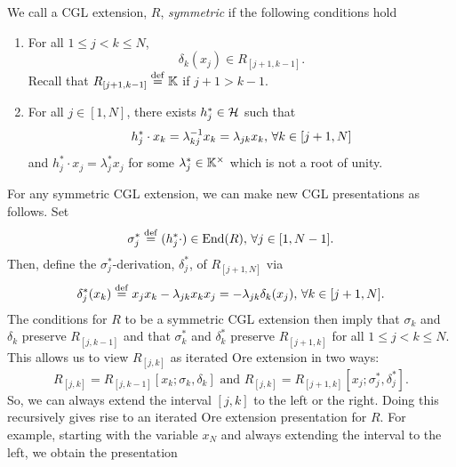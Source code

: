 \begin{definition}
	We call a CGL extension, $R$, \emph{symmetric} if the following conditions hold
	\begin{enumerate}
		\item For all $1\leq j < k \leq N$,
		      \begin{equation*}
			      \delta_k (x_j) \in R_{[j+1, k-1]}.
		      \end{equation*}
		      Recall that $R_{[j+1,k-1]} \overset{\mathrm{def}}{=} \mathbb{K}$ if $j +1 > k-1$.
		\item For all $j \in [1, N]$, there exists $h^*_j \in \mathcal{H}$ such that
		      \begin{equation*}
			      h^*_j \cdot x_k = \lambda_{kj}^{-1} x_k = \lambda_{jk}x_k, \, \forall k \in [j+1, N]
		      \end{equation*}
		      and $h^*_j \cdot x_j = \lambda^*_j x_j$ for some $\lambda_j^*\in \mathbb{K}^\times$ which is not a root of unity.
	\end{enumerate}
\end{definition}
For any symmetric CGL extension, we can make new CGL presentations as follows. Set
\begin{equation}\label{eq:sigma_star}
	\sigma_j^* \overset{\mathrm{def}}{=} (h_j^* \cdot) \in \operatorname{End}(R),\, \forall j \in [1, N-1].
\end{equation}
Then, define the $\sigma_j^*$-derivation, $\delta_j^*$, of $R_{[j+1, N]}$ via
\begin{equation}\label{eq:delta_star}
	\delta_j^*(x_k) \overset{\mathrm{def}}{=} x_j x_k - \lambda_{jk}x_kx_j = -\lambda_{jk} \delta_k (x_j), \, \forall k \in [j+1, N].
\end{equation}
%
The conditions for $R$ to be a symmetric CGL extension then imply that $\sigma_k$ and
$\delta_k$ preserve $R_{[j, k-1]}$ and that $\sigma_k^*$ and $\delta_k^*$ preserve
$R_{[j+1, k]}$ for all $1 \leq j < k \leq N$. This allows us to view $R_{[j, k]}$ as
iterated Ore extension in two ways:
\begin{equation*}
	R_{[j, k]} = R_{[j, k-1]}[x_k; \sigma_k, \delta_k] \text{ and } R_{[j,k]} = R_{[j+1, k]}[x_j; \sigma_j^*, \delta_j^*].
\end{equation*}
So, we can always extend the interval $[j, k]$ to the left or the right. Doing this recursively gives rise to an iterated Ore extension presentation for $R$. For example, starting with the variable $x_N$ and always extending the interval to the left, we obtain the presentation
